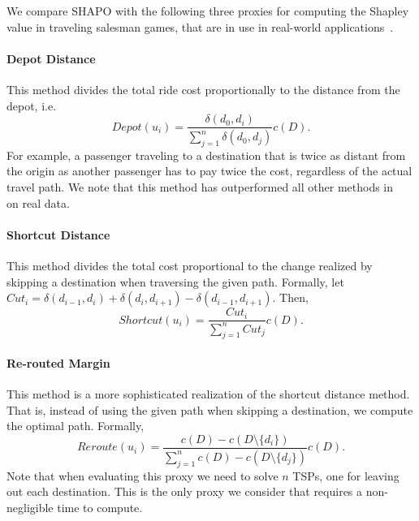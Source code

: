 \documentclass[sigconf]{aamas}
\begin{document}
We compare SHAPO with the following three proxies for computing the Shapley value in traveling salesman games, that are in use in real-world applications~\cite{aziz2016study}.


\paragraph{Depot Distance}
This method divides the total ride cost proportionally to the distance from the depot, i.e. 
\[
Depot(u_i)=\frac{\delta(d_0,d_i)}{\sum_{j=1}^{n}{\delta(d_0,d_j)}}c(D).
\]
For example, a passenger traveling to a destination that is twice as distant from the origin as another passenger has to pay twice the cost, regardless of the actual travel path.
We note that this method has outperformed all other methods in ~\cite{aziz2016study} on real data. %

\paragraph{Shortcut Distance}
This method divides the total cost proportional to the change realized by skipping a destination when traversing the given path. Formally, let $Cut_i =\delta(d_{i-1}, d_i) + \delta(d_i, d_{i+1}) - \delta(d_{i-1}, d_{i+1})$. Then,
\[
Shortcut(u_i)=\frac{Cut_i}{\sum_{j=1}^{n}Cut_j}c(D).
\]

\paragraph{Re-routed Margin}
This method is a more sophisticated realization of the shortcut distance method. That is, instead of using the given path when skipping a destination, we compute the optimal path. Formally,
\[
Reroute(u_i)=\frac{c(D)-c(D \setminus \{d_i\})}{\sum_{j=1}^{n}c(D)-c(D \setminus \{d_j\})}c(D).
\]
Note that when evaluating this proxy we need to solve $n$ TSPs, one for leaving out each destination. This is the only proxy we consider that requires a non-negligible time to compute.



\end{document}
